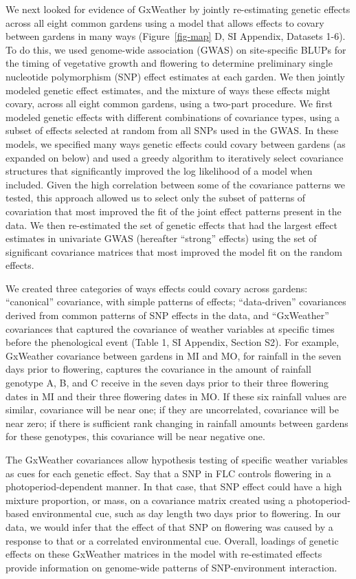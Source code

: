 \documentclass[
  9pt,
  twocolumn,
  twoside]{pnas-new}
\begin{document}
We next looked for evidence of GxWeather by jointly re-estimating
genetic effects across all eight common gardens using a model that
allows effects to covary between gardens in many ways
(Figure~\ref{fig-map} D, SI Appendix, Datasets 1-6). To do this, we used
genome-wide association (GWAS) on site-specific BLUPs for the timing of
vegetative growth and flowering to determine preliminary single
nucleotide polymorphism (SNP) effect estimates at each garden. We then
jointly modeled genetic effect estimates, and the mixture of ways these
effects might covary, across all eight common gardens, using a two-part
procedure. We first modeled genetic effects with different combinations
of covariance types, using a subset of effects selected at random from
all SNPs used in the GWAS. In these models, we specified many ways
genetic effects could covary between gardens (as expanded on below) and
used a greedy algorithm to iteratively select covariance structures that
significantly improved the log likelihood of a model when included.
Given the high correlation between some of the covariance patterns we
tested, this approach allowed us to select only the subset of patterns
of covariation that most improved the fit of the joint effect patterns
present in the data. We then re-estimated the set of genetic effects
that had the largest effect estimates in univariate GWAS (hereafter
``strong'' effects) using the set of significant covariance matrices
that most improved the model fit on the random effects.

We created three categories of ways effects could covary across gardens:
``canonical'' covariance, with simple patterns of effects;
``data-driven'' covariances derived from common patterns of SNP effects
in the data, and ``GxWeather'' covariances that captured the covariance
of weather variables at specific times before the phenological event
(Table 1, SI Appendix, Section S2). For example, GxWeather covariance
between gardens in MI and MO, for rainfall in the seven days prior to
flowering, captures the covariance in the amount of rainfall genotype A,
B, and C receive in the seven days prior to their three flowering dates
in MI and their three flowering dates in MO. If these six rainfall
values are similar, covariance will be near one; if they are
uncorrelated, covariance will be near zero; if there is sufficient rank
changing in rainfall amounts between gardens for these genotypes, this
covariance will be near negative one.

The GxWeather covariances allow hypothesis testing of specific weather
variables as cues for each genetic effect. Say that a SNP in FLC
controls flowering in a photoperiod-dependent manner. In that case, that
SNP effect could have a high mixture proportion, or mass, on a
covariance matrix created using a photoperiod-based environmental cue,
such as day length two days prior to flowering. In our data, we would
infer that the effect of that SNP on flowering was caused by a response
to that or a correlated environmental cue. Overall, loadings of genetic
effects on these GxWeather matrices in the model with re-estimated
effects provide information on genome-wide patterns of SNP-environment
interaction.
\end{document}
